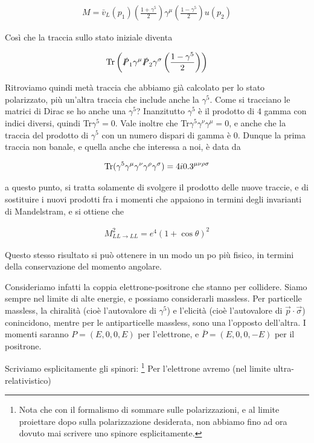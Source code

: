 \documentclass[11pt]{report}
\begin{document}
\begin{align}
    M = \bar{v}_L(p_1)\left(\frac{1+\gamma^5}{2} \right)\gamma^\mu\left(\frac{1-\gamma^5}{2} \right)u(p_2)
\end{align}

Così che la traccia sullo stato iniziale diventa 

\begin{align}
    \text{Tr}\left(\slashed{P}_1\gamma^\mu\slashed{P}_2\gamma^\sigma\left(\frac{1-\gamma^5}{2} \right)\right)
\end{align}

Ritroviamo quindi metà traccia che abbiamo già calcolato per lo stato polarizzato, più un'altra traccia che include anche la \(\gamma^5\). Come si tracciano le matrici di Dirac se ho anche una \(\gamma^5\)? Inanzitutto \(\gamma^5\) è il prodotto di 4 gamma con indici diversi, quindi Tr\(\gamma^5 = 0\). Vale inoltre che Tr\(\gamma^5\gamma^\nu\gamma^\mu = 0\), e anche che la traccia del prodotto di \(\gamma^5\) con un numero dispari di gamma è 0. Dunque la prima traccia non banale, e quella anche che interessa a noi, è data da 

\begin{align}
    \text{Tr}(\gamma^5\gamma^\mu\gamma^\nu\gamma^\rho\gamma^\sigma) = 4i0.3^{\mu\nu\rho\sigma}
\end{align}

a questo punto, si tratta solamente di svolgere il prodotto delle nuove traccie, e di sostituire i nuovi prodotti fra i momenti che appaiono in termini degli invarianti di Mandelstram, e si ottiene che 

\begin{align}
    M^2_{LL\rightarrow LL} = e^4(1+\cos\theta)^2
\end{align}

Questo stesso risultato si può ottenere in un modo un po più fisico, in termini della conservazione del momento angolare. 

Consideriamo infatti la coppia elettrone-positrone che stanno per collidere. Siamo sempre nel limite di alte energie, e possiamo considerarli massless. Per particelle massless, la chiralità (cioè l'autovalore di \(\gamma^5\)) e l'elicità (cioè l'autovalore di \(\vec{p}\cdot \vec{\sigma}\)) conincidono, mentre per le antiparticelle massless, sono una l'opposto dell'altra. I momenti saranno \(P = (E, 0, 0, E)\) per l'elettrone, e \(\bar{P} = (E, 0, 0, -E)\) per il positrone. 

Scriviamo esplicitamente gli spinori: \footnote{Nota che con il formalismo di sommare sulle polarizzazioni, e al limite proiettare dopo sulla polarizzazione desiderata, non abbiamo fino ad ora dovuto mai scrivere uno spinore esplicitamente.} Per l'elettrone avremo (nel limite ultra-relativistico)
\end{document}

